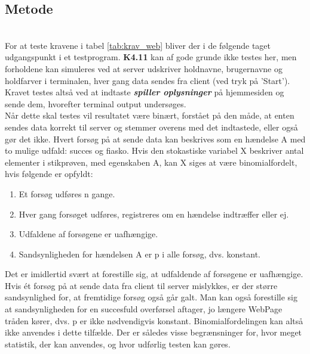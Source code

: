 \documentclass[Modultest/Modultest_main.tex]{subfiles}
\begin{document}
\subsection{Metode}
\\For at teste kravene i tabel \ref{tab:krav_web} bliver der i de følgende taget udgangspunkt i et testprogram. \textbf{K4.11} kan af gode grunde ikke testes her, men forholdene kan simuleres ved at server udskriver holdnavne, brugernavne og holdfarver i terminalen, hver gang data sendes fra client (ved tryk på 'Start'). Kravet testes altså ved at indtaste \textit{\textbf{spiller oplysninger}} på hjemmesiden og sende dem, hvorefter terminal output undersøges.
\\Når dette skal testes vil resultatet være binært, forstået på den måde, at enten sendes data korrekt til server og stemmer overens med det indtastede, eller også gør det ikke. Hvert forsøg på at sende data kan beskrives som en hændelse A med to mulige udfald: succes og fiasko.
Hvis den stokastiske variabel X beskriver antal elementer i stikprøven, med egenskaben A, kan X siges at være binomialfordelt, hvis følgende er opfyldt:\cite{binomial_wiki}
\begin{enumerate}
    \item Et forsøg udføres n gange.
    \item Hver gang forsøget udføres, registreres om en hændelse indtræffer eller ej.
    \item Udfaldene af forsøgene er uafhængige.
    \item Sandsynligheden for hændelsen A er p i alle forsøg, dvs. konstant.
\end{enumerate}
Det er imidlertid svært at forestille sig, at udfaldende af forsøgene er uafhængige. Hvis ét forsøg på at sende data fra client til server mislykkes, er der større sandsynlighed for, at
fremtidige forsøg også går galt. Man kan også forestille sig at sandsynligheden for en succesfuld overførsel aftager, jo længere WebPage tråden kører, dvs. p er ikke nødvendigvis konstant. Binomialfordelingen kan altså ikke anvendes i dette tilfælde. Der er således visse begrænsninger for, hvor meget statistik, der kan anvendes, og hvor udførlig testen kan gøres. \\
\newpage
\end{document}
